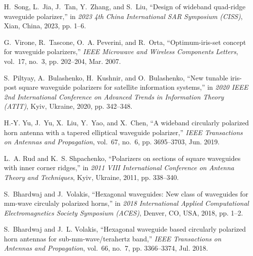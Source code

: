 \documentclass[lettersize,journal]{IEEEtran}
\begin{document}
\begin{thebibliography}{1}
    H.~Song, L.~Jia, J.~Tan, Y.~Zhang, and S.~Liu, ``Design of wideband quad-ridge waveguide polarizer,'' in \emph{2023 4th China International SAR Symposium (CISS)}, Xian, China, 2023, pp. 1--6.
    
    G.~Virone, R.~Tascone, O.~A. Peverini, and R.~Orta, ``Optimum-iris-set concept for waveguide polarizers,'' \emph{IEEE Microwave and Wireless Components Letters}, vol.~17, no.~3, pp. 202--204, Mar. 2007.
    
    S.~Piltyay, A.~Bulashenko, H.~Kushnir, and O.~Bulashenko, ``New tunable iris-post square waveguide polarizers for satellite information systems,'' in \emph{2020 IEEE 2nd International Conference on Advanced Trends in Information Theory (ATIT)}, Kyiv, Ukraine, 2020, pp. 342--348.
    
    H.-Y. Yu, J.~Yu, X.~Liu, Y.~Yao, and X.~Chen, ``A wideband circularly polarized horn antenna with a tapered elliptical waveguide polarizer,'' \emph{IEEE Transactions on Antennas and Propagation}, vol.~67, no.~6, pp. 3695--3703, Jun. 2019.
    
    L.~A. Rud and K.~S. Shpachenko, ``Polarizers on sections of square waveguides with inner corner ridges,'' in \emph{2011 VIII International Conference on Antenna Theory and Techniques}, Kyiv, Ukraine, 2011, pp. 338--340.
    
    S.~Bhardwaj and J.~Volakis, ``Hexagonal waveguides: New class of waveguides for mm-wave circulaly polarized horns,'' in \emph{2018 International Applied Computational Electromagnetics Society Symposium (ACES)}, Denver, CO, USA, 2018, pp. 1--2.
    
    S.~Bhardwaj and J.~L. Volakis, ``Hexagonal waveguide based circularly polarized horn antennas for sub-mm-wave/terahertz band,'' \emph{IEEE Transactions on Antennas and Propagation}, vol.~66, no.~7, pp. 3366--3374, Jul. 2018.
    

\end{thebibliography}
\end{document}
